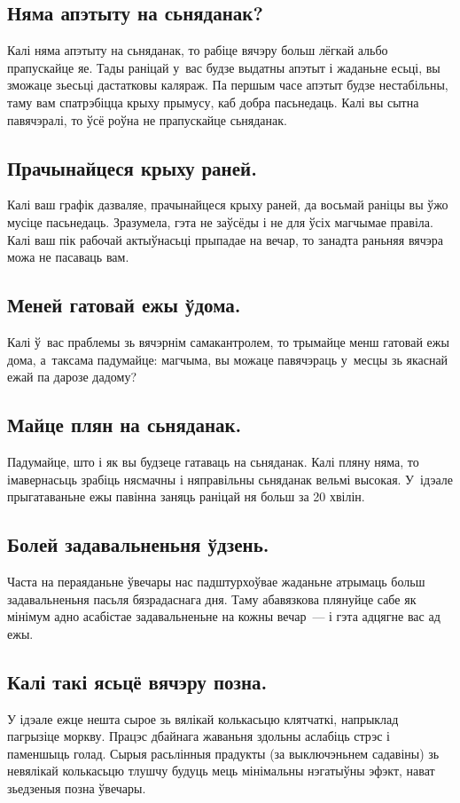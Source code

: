 \subsection{Няма апэтыту на сьняданак?}
Калі няма апэтыту на сьняданак, то рабіце вячэру больш лёгкай альбо прапускайце яе. Тады раніцай у~вас будзе выдатны апэтыт і жаданьне есьці, вы зможаце зьесьці дастатковы каляраж. Па першым часе апэтыт будзе нестабільны, таму вам спатрэбіцца крыху прымусу, каб добра пасьнедаць. Калі вы сытна павячэралі, то ўсё роўна не прапускайце сьняданак.

\subsection{Прачынайцеся крыху раней.}
Калі ваш графік дазваляе, прачынайцеся крыху раней, да восьмай раніцы вы ўжо мусіце пасьнедаць. Зразумела, гэта не заўсёды і не для ўсіх магчымае правіла. Калі ваш пік рабочай актыўнасьці прыпадае на вечар, то занадта раньняя вячэра можа не пасаваць вам.

\subsection{Меней гатовай ежы ўдома.}
Калі ў~вас праблемы зь вячэрнім самакантролем, то трымайце менш гатовай ежы дома, а~таксама падумайце: магчыма, вы можаце павячэраць у~месцы зь якаснай ежай па дарозе дадому?

\subsection{Майце плян на сьняданак.}
Падумайце, што і як вы будзеце гатаваць на сьняданак. Калі пляну няма, то імавернасьць зрабіць нясмачны і няправільны сьняданак вельмі высокая. У~ідэале прыгатаваньне ежы павінна заняць раніцай ня больш за 20 хвілін.

\subsection{Болей задавальненьня ўдзень.}
Часта на пераяданьне ўвечары нас падштурхоўвае жаданьне атрымаць больш задавальненьня пасьля бязрадаснага дня. Таму абавязкова плянуйце сабе як мінімум адно асабістае задавальненьне на кожны вечар~--- і гэта адцягне вас ад ежы.

\subsection{Калі такі ясьцё вячэру позна.}
У ідэале ежце нешта сырое зь вялікай колькасьцю клятчаткі, напрыклад пагрызіце моркву. Працэс дбайнага жаваньня здольны аслабіць стрэс і паменшыць голад. Сырыя расьлінныя прадукты (за выключэньнем садавіны) зь невялікай колькасьцю тлушчу будуць мець мінімальны нэгатыўны эфэкт, нават зьедзеныя позна ўвечары.
